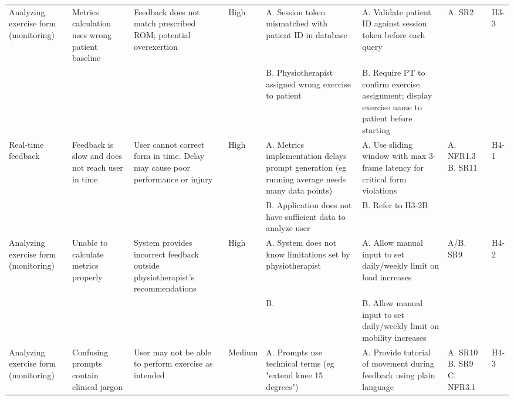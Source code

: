\documentclass{article}
\begin{document}
\begin{landscape}
\begin{center}
\begin{xltabular}{\linewidth}{
    L{1.6cm}  
    L{1.8cm}  
    L{2cm}    
    L{0.8cm}  
    L{2cm}    
    L{2.2cm}  
    L{1.3cm}  
    L{0.8cm}  
}

Analyzing exercise form (monitoring) & 
Metrics calculation uses wrong patient baseline & 
Feedback does not match prescribed ROM; potential overexertion & 
High & 
A. Session token mismatched with patient ID in database & 
A. Validate patient ID against session token before each query & 
A. SR2 & 
H3-3 \\

& & & & 
B. Physiotherapist assigned wrong exercise to patient & 
B. Require PT to confirm exercise assignment; display exercise name to patient before starting & 
& \\


Real-time feedback & 
Feedback is slow and does not reach user in time & 
User cannot correct form in time. Delay may cause poor performance or injury & 
High & 
A. Metrics implementation delays prompt generation (eg running average needs many data points) & 
A. Use sliding window with max 3-frame latency for critical form violations & 
A. NFR1.3 \newline
B. SR11 & 
H4-1 \\

& & & & 
B. Application does not have sufficient data to analyze user & 
B. Refer to H3-2B & 
& \\


Analyzing exercise form (monitoring) & 
Unable to calculate metrics properly & 
System provides incorrect feedback outside physiotherapist's recommendations & 
High & 
A. System does not know limitations set by physiotherapist & 
A. Allow manual input to set daily/weekly limit on load increases & 
A/B. SR9 & 
H4-2 \\

& & & & 
B. & 
B. Allow manual input to set daily/weekly limit on mobility increases & 
& \\


Analyzing exercise form (monitoring) & 
Confusing prompts contain clinical jargon & 
User may not be able to perform exercise as intended & 
Medium & 
A. Prompts use technical terms (eg "extend knee 15 degrees") & 
A. Provide tutorial of movement during feedback using plain language & 
A. SR10 \newline
B. SR9 \newline
C. NFR3.1 & 
H4-3 \\


\end{xltabular}
\end{center}
\end{landscape}
\end{document}
